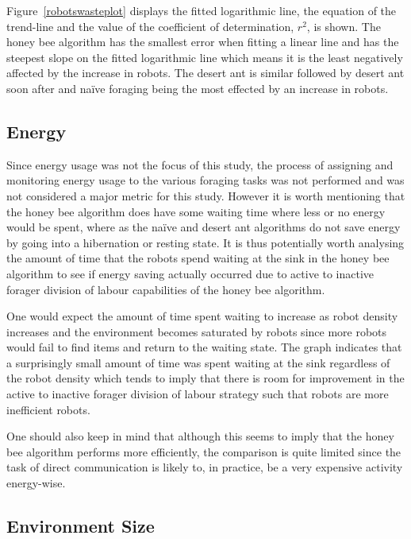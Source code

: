 Figure~\ref{robotswasteplot} displays the fitted logarithmic line, the equation of the trend-line and the value of the coefficient of determination, $r^2$, is shown. The honey bee algorithm has the smallest error when fitting a linear line and has the steepest slope on the fitted logarithmic line which means it is the least negatively affected by the increase in robots. The desert ant is similar followed by desert ant soon after and na\"ive foraging being the most effected by an increase in robots. %


\subsection{Energy}
\label{results:energy}

Since energy usage was not the focus of this study, the process of assigning and monitoring energy usage to the various foraging tasks was not performed and was not considered a major metric for this study. However it is worth mentioning that the honey bee algorithm does have some waiting time where less or no energy would be spent, where as the na\"ive and desert ant algorithms do not save energy by going into a hibernation or resting state. It is thus potentially worth analysing the amount of time that the robots spend waiting at the sink in the honey bee algorithm to see if energy saving actually occurred due to active to inactive forager division of labour capabilities of the honey bee algorithm. 

One would expect the amount of time spent waiting to increase as robot density increases and the environment becomes saturated by robots since more robots would fail to find items and return to the waiting state. The graph indicates that a surprisingly small amount of time was spent waiting at the sink regardless of the robot density which tends to imply that there is room for improvement in the active to inactive forager division of labour strategy such that robots are more inefficient robots. 

One should also keep in mind that although this seems to imply that the honey bee algorithm performs more efficiently, the comparison is quite limited since the task of direct communication is likely to, in practice, be a very expensive activity energy-wise.

\subsection{Environment Size}
\label{results:environmentsize}

